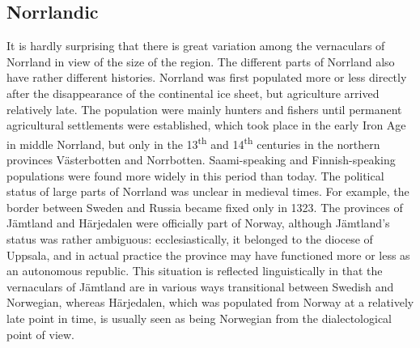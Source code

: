 \subsection{\rmfamily Norrlandic}

\begin{styleBodyTextFirst}
It is hardly surprising that there is great variation among the vernaculars of Norrland in view of the size of the region. The different parts of Norrland also have rather different histories. Norrland was first populated more or less directly after the disappearance of the continental ice sheet, but agriculture arrived relatively late. The population were mainly hunters and fishers until permanent agricultural settlements were established, which took place in the early Iron Age in middle Norrland, but only in the 13\textsuperscript{th} and 14\textsuperscript{th} centuries in the northern provinces Västerbotten and Norrbotten. Saami-speaking and Finnish-speaking populations were found more widely in this period than today. The political status of large parts of Norrland was unclear in medieval times. For example, the border between Sweden and Russia became fixed only in 1323. The provinces of Jämtland and Härjedalen were officially part of Norway, although Jämtland’s status was rather ambiguous: ecclesiastically, it belonged to the diocese of Uppsala, and in actual practice the province may have functioned more or less as an autonomous republic. This situation is reflected linguistically in that the vernaculars of Jämtland are in various ways transitional between Swedish and Norwegian, whereas Härjedalen, which was populated from Norway at a relatively late point in time, is usually seen as being Norwegian from the dialectological point of view.

\end{styleBodyTextFirst}

